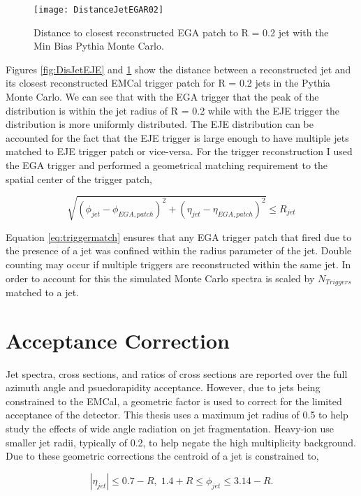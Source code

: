 \begin{figure}[h]
\texttt{[image: DistanceJetEGAR02]}
\centering
\caption{Distance to closest reconstructed EGA patch to R = 0.2 jet with the Min Bias Pythia Monte Carlo.}
\label{fig:DisJetEGA}
\end{figure}

\noindent
Figures \ref{fig:DisJetEJE} and \ref{fig:DisJetEGA} show the distance between a reconstructed jet and its closest reconstructed EMCal trigger patch for R = 0.2 jets in the Pythia Monte Carlo.  We can see that with the EGA trigger that the peak of the distribution is within the jet radius of R = 0.2 while with the EJE trigger the distribution is more uniformly distributed.  The EJE distribution can be accounted for the fact that the EJE trigger is large enough to have multiple jets matched to EJE trigger patch or vice-versa.  For the trigger reconstruction I used the EGA trigger and performed a geometrical matching requirement to the spatial center of the trigger patch,

\begin{equation}
\sqrt{ ( \phi_{jet} - \phi_{EGA, patch} )^{2} + ( \eta_{jet} - \eta_{EGA, patch} )^{2}}  \leq R_{jet} 
\label{eq:triggermatch}
\end{equation}

\noindent
Equation \ref{eq:triggermatch} ensures that any EGA trigger patch that fired due to the presence of a jet was confined within the radius parameter of the jet.  Double counting may occur if multiple triggers are reconstructed within the same jet.  In order to account for this the simulated Monte Carlo spectra is scaled by $N_{Triggers}$ matched to a jet.

\section{Acceptance Correction}
Jet spectra, cross sections, and ratios of cross sections are reported over the full azimuth angle and psuedorapidity acceptance.  However, due to jets being constrained to the EMCal, a geometric factor is used to correct for the limited acceptance of the detector.  This thesis uses a maximum jet radius of 0.5 to help study the effects of wide angle radiation on jet fragmentation.  Heavy-ion use smaller jet radii, typically of 0.2, to help negate the high multiplicity background.  Due to these geometric corrections the centroid of a jet is constrained to,

\begin{equation}
|\eta_{jet}| \leq 0.7 - R, \; 1.4 + R \leq \phi_{jet} \leq 3.14 -R.
\label{eq:jetconstration}
\end{equation}

